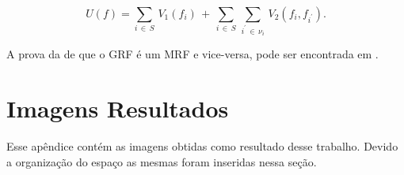 \begin{equation}
	U(f) = \sum_{i \,\in\, S}^{} \, V_{1}(f_{i}) \,+\, \sum_{i \,\in\, S}^{} \, \sum_{i^{'} \,\in\, \nu_{i} }^{} \, V_{2}(f_{i},f_{i^{'}}).
	\label{eq:eqApendiceBDistribuicaoGibbsU3}
\end{equation} 

A prova da de que o \acs{GRF} é um \acs{MRF} e vice-versa, pode ser encontrada em .


\chapter{Imagens Resultados}\label{ApendiceC:ImagensResultados}

Esse apêndice contém as imagens obtidas como resultado desse trabalho. Devido a organização do espaço as mesmas foram inseridas nessa seção.


